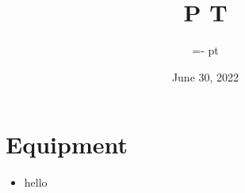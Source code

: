 \documentclass{article}
\title{P T}
\author{
    \vbox{\let\\\cr \lineskiplimit=-\maxdimen \baselineskip=14 pt
\ialign{\hss##\hss\crcr Djivan Gasparyan\\ Jonah Quincy\\ Benny Domito\\ Susan Bennett\\}}}
\date{June 30, 2022}
\begin{document}
\maketitle
\newpage

\section{Equipment}
\begin{itemize}
    \item hello
\end{itemize}
\end{document}
